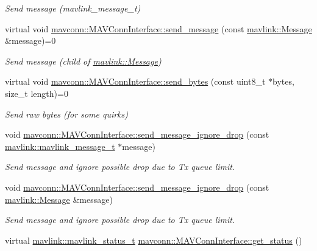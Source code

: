 \begin{DoxyCompactItemize}
\begin{DoxyCompactList}\small\item\em Send message (mavlink\+\_\+message\+\_\+t) \end{DoxyCompactList}\item 
virtual void \mbox{\hyperlink{group__mavconn_ga204ee5ba0dc31519b0ea7a9ac50d486c}{mavconn\+::\+M\+A\+V\+Conn\+Interface\+::send\+\_\+message}} (const \mbox{\hyperlink{structmavlink_1_1Message}{mavlink\+::\+Message}} \&message)=0
\begin{DoxyCompactList}\small\item\em Send message (child of \mbox{\hyperlink{structmavlink_1_1Message}{mavlink\+::\+Message}}) \end{DoxyCompactList}\item 
virtual void \mbox{\hyperlink{group__mavconn_ga7d00279e176e9a6890ed47ab1ceeb597}{mavconn\+::\+M\+A\+V\+Conn\+Interface\+::send\+\_\+bytes}} (const uint8\+\_\+t $\ast$bytes, size\+\_\+t length)=0
\begin{DoxyCompactList}\small\item\em Send raw bytes (for some quirks) \end{DoxyCompactList}\item 
void \mbox{\hyperlink{group__mavconn_gabf049aebc9a9a9abfd36a1fb0034a433}{mavconn\+::\+M\+A\+V\+Conn\+Interface\+::send\+\_\+message\+\_\+ignore\+\_\+drop}} (const \mbox{\hyperlink{include__v0_89_2mavlink__types_8h_a63b963764c09dc72f4910c1521e325b9}{mavlink\+::mavlink\+\_\+message\+\_\+t}} $\ast$message)
\begin{DoxyCompactList}\small\item\em Send message and ignore possible drop due to Tx queue limit. \end{DoxyCompactList}\item 
void \mbox{\hyperlink{group__mavconn_gaafdea305c3cd449ac629f84598febbe0}{mavconn\+::\+M\+A\+V\+Conn\+Interface\+::send\+\_\+message\+\_\+ignore\+\_\+drop}} (const \mbox{\hyperlink{structmavlink_1_1Message}{mavlink\+::\+Message}} \&message)
\begin{DoxyCompactList}\small\item\em Send message and ignore possible drop due to Tx queue limit. \end{DoxyCompactList}\item 
virtual \mbox{\hyperlink{include__v2_80_2mavlink__types_8h_aec6f7af3879252822d8fb108e97aafc2}{mavlink\+::mavlink\+\_\+status\+\_\+t}} \mbox{\hyperlink{group__mavconn_gaa3c7017b05ca60187122edf2ec196918}{mavconn\+::\+M\+A\+V\+Conn\+Interface\+::get\+\_\+status}} ()

\end{DoxyCompactItemize}
